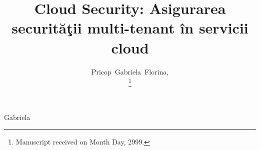 \title{Cloud Security: Asigurarea securit\u{a}\c{t}ii multi-tenant \^{i}n servicii cloud}

%
%
\author{Pricop~Gabriela~Florina,
        
\thanks{Manuscript received on Month Day, 2999.}
}
%
{Gabriela}%
%

